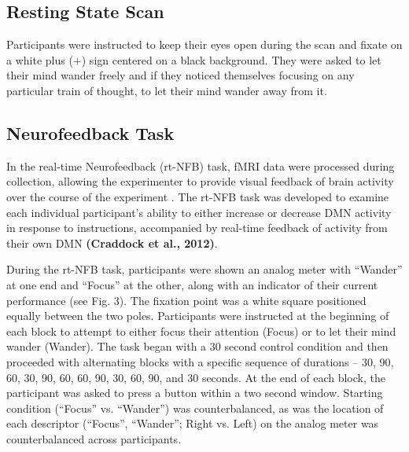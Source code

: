 \subsection{Resting State Scan}

Participants were instructed to keep their eyes open during the scan and fixate on a white plus ($+$) sign centered on a black background. They were asked to let their mind wander freely and if they noticed themselves focusing on any particular train of thought, to let their mind wander away from it.

\subsection{Neurofeedback Task}

In the real-time Neurofeedback (rt-NFB) task, fMRI data were processed during collection, allowing the experimenter to provide visual feedback of brain activity over the course of the experiment \cite{Cox_1995,LaConte_2011,McDonald2017}. The rt-NFB task was developed to examine each individual participant's ability to either increase or decrease DMN activity in response to instructions, accompanied by real-time feedback of activity from their own DMN \cite{McDonald2017}\textbf{(Craddock et al., 2012)}.

During the rt-NFB task, participants were shown an analog meter with ``Wander'' at one end and     ``Focus'' at the other, along with an indicator of their current performance (see Fig. 3). The fixation point was a white square positioned equally between the two poles. Participants were instructed at the beginning of each block to attempt to either focus their attention (Focus) or to let their mind wander (Wander). The task began with a 30 second control condition and then proceeded with alternating blocks with a specific sequence of durations -- 30, 90, 60, 30, 90, 60, 60, 90, 30, 60, 90, and 30 seconds. At the end of each block, the participant was asked to press a button within a two second window. Starting condition (``Focus'' vs. ``Wander'') was counterbalanced, as was the location of each descriptor (``Focus'', ``Wander''; Right vs. Left) on the analog meter was counterbalanced across participants. 

